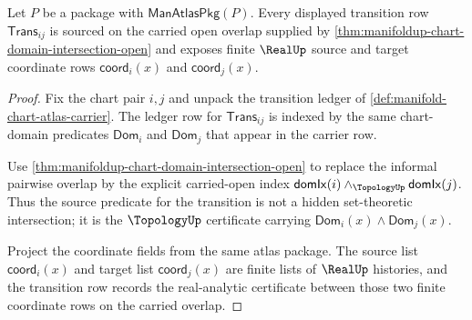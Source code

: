 \begin{theorem}
\label{thm:manifoldup-overlap-transition-source-carried}
Let $P$ be a package with $\mathsf{ManAtlasPkg}(P)$. Every displayed transition
row $\mathsf{Trans}_{ij}$ is sourced on the carried open overlap supplied by
\autoref{thm:manifoldup-chart-domain-intersection-open} and exposes finite
$\RealUp$ source and target coordinate rows
$\mathsf{coord}_i(x)$ and $\mathsf{coord}_j(x)$.
\end{theorem}
\begin{proof}
Fix the chart pair $i,j$ and unpack the transition ledger of
\autoref{def:manifold-chart-atlas-carrier}. The ledger row for
$\mathsf{Trans}_{ij}$ is indexed by the same chart-domain predicates
$\mathsf{Dom}_i$ and $\mathsf{Dom}_j$ that appear in the carrier row.

Use \autoref{thm:manifoldup-chart-domain-intersection-open} to replace the
informal pairwise overlap by the explicit carried-open index
$\mathsf{domIx}(i)\wedge_{\TopologyUp}\mathsf{domIx}(j)$. Thus the source
predicate for the transition is not a hidden set-theoretic intersection; it is
the $\TopologyUp$ certificate carrying
$\mathsf{Dom}_i(x)\wedge\mathsf{Dom}_j(x)$.

Project the coordinate fields from the same atlas package. The source list
$\mathsf{coord}_i(x)$ and target list $\mathsf{coord}_j(x)$ are finite lists of
$\RealUp$ histories, and the transition row records the real-analytic
certificate between those two finite coordinate rows on the carried overlap.
\end{proof}

